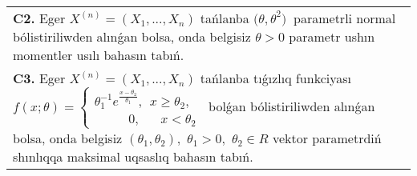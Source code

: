 \documentclass{article}
\begin{document}
\begin{tabular}{m{17cm}}
 \\
\textbf{C2.} 
Eger \(X^{(n)} = \left( X_{1},...,X_{n} \right)\) tańlanba \({(\theta,\theta}^{2})\ \) parametrli normal bólistiriliwden alınǵan bolsa, onda belgisiz \(\theta > 0\) parametr ushın momentler usılı bahasın tabıń.
 \\
\textbf{C3.} 
Eger \(X^{(n)} = \left( X_{1},...,X_{n} \right)\) tańlanba tıǵızlıq funkciyası
$f(x;\theta) = \left\{ \begin{matrix}
\theta_{1}^{- 1}e^{\frac{x - \theta_{2}}{\theta_{1}}},\ \ x \geq \theta_{2}, \\
\ \ \ \ \ \ \ \ \ \ \ \ 0,\ \ \ \ \ \ \ x < \theta_{2}
\end{matrix} \right.\ $
bolǵan bólistiriliwden alınǵan bolsa, onda belgisiz \(\left( \theta_{1},\theta_{2} \right),\) \(\theta_{1} > 0,\) \(\theta_{2} \in R\) vektor parametrdiń shınlıqqa maksimal uqsaslıq bahasın tabıń.
 \\

\end{tabular}
\vspace{1cm}
\end{document}
